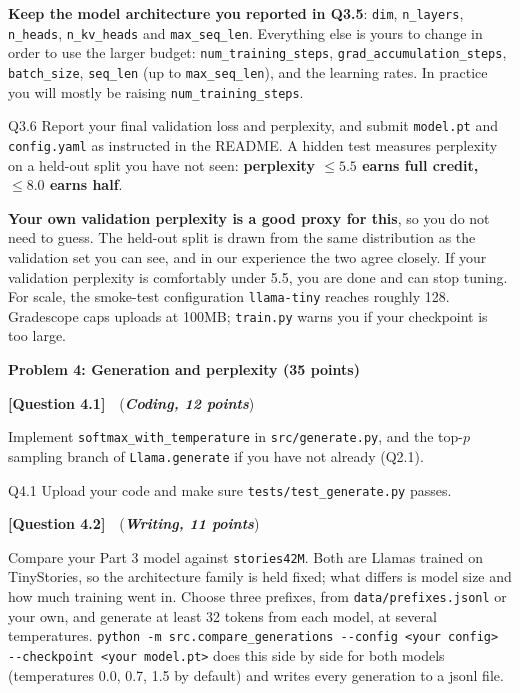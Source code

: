 \documentclass[11pt]{article}
\newcommand{\problem}[1]{%
  \vspace{1em}
  \noindent\colorbox{headerblue}{\parbox{\dimexpr\textwidth-2\fboxsep}{%
    \vspace{2pt}\textbf{\large #1}\vspace{2pt}}}
  \vspace{0.6em}
}
\newcommand{\question}[3]{%
  \vspace{0.9em}
  \noindent\textbf{[Question #1]}\ \ (\textit{\textbf{#2, #3 points}})\quad
}
\begin{document}
\textbf{Keep the model architecture you reported in Q3.5}: \texttt{dim}, \texttt{n\_layers},
\texttt{n\_heads}, \texttt{n\_kv\_heads} and \texttt{max\_seq\_len}. Everything else is yours to
change in order to use the larger budget: \texttt{num\_training\_steps},
\texttt{grad\_accumulation\_steps}, \texttt{batch\_size}, \texttt{seq\_len} (up to
\texttt{max\_seq\_len}), and the learning rates. In practice you will mostly be raising
\texttt{num\_training\_steps}.

\begin{deliverables}{Q3.6}
Report your final validation loss and perplexity, and submit \texttt{model.pt} and
\texttt{config.yaml} as instructed in the README. A hidden test measures perplexity on a held-out
split you have not seen: \textbf{perplexity $\leq 5.5$ earns full credit, $\leq 8.0$ earns half}.

\textbf{Your own validation perplexity is a good proxy for this}, so you do not need to guess. The
held-out split is drawn from the same distribution as the validation set you can see, and in our
experience the two agree closely. If your validation perplexity is comfortably under 5.5, you are
done and can stop tuning. For scale, the smoke-test configuration \texttt{llama-tiny} reaches
roughly 128. Gradescope caps uploads at 100MB; \texttt{train.py} warns you if your checkpoint is too
large.
\end{deliverables}

\problem{Problem 4: Generation and perplexity (35 points)}

\question{4.1}{Coding}{12}
Implement \texttt{softmax\_with\_temperature} in \texttt{src/generate.py}, and the top-$p$ sampling
branch of \texttt{Llama.generate} if you have not already (Q2.1).

\begin{deliverables}{Q4.1}
Upload your code and make sure \texttt{tests/test\_generate.py} passes.
\end{deliverables}

\question{4.2}{Writing}{11}
Compare your Part 3 model against \texttt{stories42M}. Both are Llamas trained on TinyStories, so
the architecture family is held fixed; what differs is model size and how much training went in. Choose
three prefixes, from \texttt{data/prefixes.jsonl} or your own, and generate at least 32 tokens
from each model, at several temperatures. \texttt{python -m src.compare\_generations
-\/-config <your config> -\/-checkpoint <your model.pt>} does this side by side for both models
(temperatures 0.0, 0.7, 1.5 by default) and writes every generation to a jsonl file.
\end{document}
